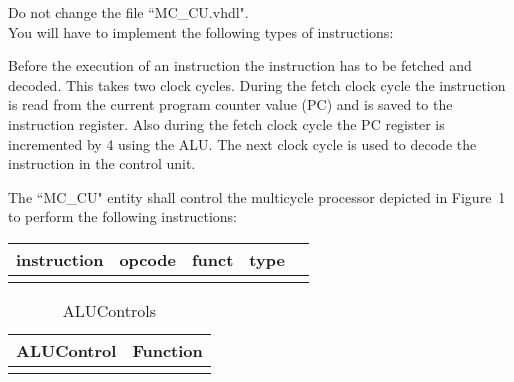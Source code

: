 \documentclass[a4paper,12pt]{article}
\newcommand\Tstrut{\rule{0pt}{2.6ex}}       %
\begin{document}
\begin{center}
\end{center}

Do not change the file ``MC\_CU.vhdl".\\

You will have to implement the following types of instructions:


Before the execution of an instruction the instruction has to be fetched and decoded. This takes two clock cycles. During the fetch clock cycle the instruction is read from the current program counter value (PC) and is saved to the instruction register. Also during the fetch clock cycle the PC register is incremented by 4 using the ALU. The next clock cycle is used to decode the instruction in the control unit. %

The ``MC\_CU" entity shall control the multicycle processor depicted in Figure~1 to perform the following instructions:

\begin{table}[h!]
\centering
    \begin{tabular}{|c|c|c|c|c|} \hline \Tstrut
		instruction & opcode  & funct & type   \\ \hline \Tstrut
    \hline
    \end{tabular}
\end{table}



\begin{table}[h!]
\centering
    \begin{tabular}{|c|c|} \hline \Tstrut
		ALUControl & Function   \\ \hline \Tstrut
    \hline
    \end{tabular}
    \caption{ALUControls}
    \label{tab:ALUControls}
\end{table}
\end{document}
